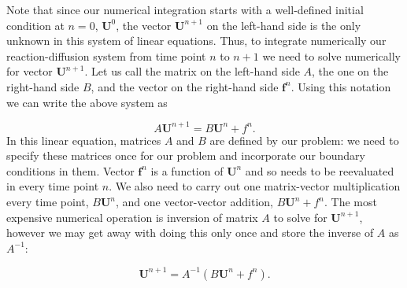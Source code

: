 \documentclass[../summary.tex]{subfiles}
\begin{document}
Note that since our numerical integration starts with a well-defined initial condition at $n=0$, $\mathbf{U}^0$, the
vector $\mathbf{U}^{n+1}$ on the left-hand side is the only unknown in this system of linear equations.
Thus, to integrate numerically our reaction-diffusion system from time point $n$ to $n+1$ we need to solve numerically for vector $\mathbf{U}^{n+1}$.
Let us call the matrix on the left-hand side $A$, the one on the right-hand side $B$, and the vector on the right-hand side $\mathbf{f}^n$.
Using this notation we can write the above system as

\begin{equation}
    A \mathbf{U}^{n+1} = B \mathbf{U}^n + f^n.
\end{equation}
In this linear equation, matrices $A$ and $B$ are defined by our problem: we need to specify these matrices once for our
problem and incorporate our boundary conditions in them.
Vector $\mathbf{f}^n$ is a function of $\mathbf{U}^n$ and so needs to be reevaluated in every time point $n$.
We also need to carry out one matrix-vector multiplication every time point, $B \mathbf{U}^n$, and
one vector-vector addition, $B \mathbf{U}^n + f^n$.
The most expensive numerical operation is inversion of matrix $A$ to solve for $\mathbf{U}^{n+1}$, however we may
get away with doing this only once and store the inverse of $A$ as $A^{-1}$:

\begin{equation}
    \mathbf{U}^{n+1} = A^{-1} \left( B \mathbf{U}^n + f^n \right).
\end{equation}
\end{document}
